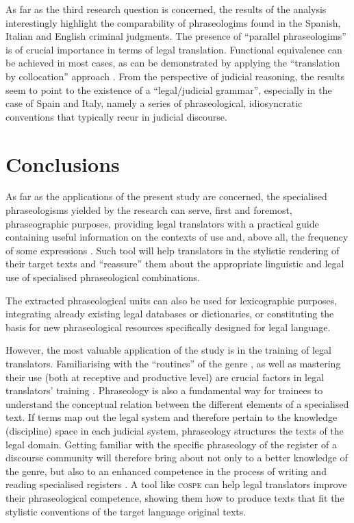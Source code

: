 \documentclass[output=paper]{LSP/langsci}
\begin{document}
As far as the third research question is concerned, the results of the analysis interestingly highlight the comparability of phraseologims found in the Spanish, Italian and English criminal judgments. The presence of “parallel phraseologims” is of crucial importance in terms of legal translation. Functional equivalence \citep[see][]{TogniniBonelli1996} can be achieved in most cases, as can be demonstrated by applying the “translation by collocation” approach \citep[see][]{TogniniBonelli2004,Pontrandolfo2013a}. From the perspective of judicial reasoning, the results seem to point to the existence of a “legal/judicial grammar”, especially in the case of Spain and Italy, namely a series of phraseological, idiosyncratic conventions that typically recur in judicial discourse.

\section{Conclusions}
As far as the applications of the present study are concerned, the specialised phraseologisms yielded by the research can serve, first and foremost, phraseographic purposes, providing legal translators with a practical guide containing useful information on the contexts of use and, above all, the frequency of some expressions \citep[see][]{Lombardi2004}. Such tool will help translators in the stylistic rendering of their target texts and “reassure” them about the appropriate linguistic and legal use of specialised  phraseological combinations.

The extracted phraseological units can also be used for lexicographic purposes, integrating already existing legal databases or dictionaries, or constituting the basis for new phraseological resources specifically designed for legal language.

However, the most valuable application of the study is in the training of legal translators. Familiarising with the “routines” of the genre \citep{Hatim1997}, as well as mastering their use (both at receptive and productive level) are crucial factors in legal translators’ training \citep[see][]{Garzone2007}. Phraseology is also a fundamental way for trainees to understand the conceptual relation between the different elements of a specialised text. If terms map out the legal system and therefore pertain to the knowledge (discipline) space in each judicial system, phraseology structures the texts of the legal domain. Getting familiar with the specific phraseology of the register of a discourse community will therefore bring about not only to a better knowledge of the genre, but also to an enhanced competence in the process of writing and reading specialised registers \citep[see][]{Williams2002}. A tool like \textsc{cospe} can help legal translators improve their phraseological competence, showing them how to produce texts that fit the stylistic conventions of the target language original texts.
\end{document}
